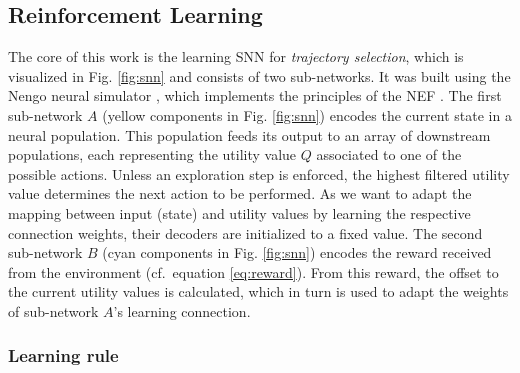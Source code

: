 \subsection{Reinforcement Learning}%
\label{subsec:reinforcement_learning_network}

The core of this work is the learning \acl{SNN} for \emph{trajectory selection}, which  is visualized in Fig. \ref{fig:snn} and consists of two sub-networks.
It was built using the Nengo neural simulator \cite{Bekolay2013}, which implements the principles of the \ac{NEF} \cite{Eliasmith2003}.
The first sub-network $A$ (yellow components in Fig. \ref{fig:snn}) encodes the current state in a neural population.
This population feeds its output to an array of downstream populations, each representing the utility value $Q$ associated to one of the possible actions.
Unless an exploration step is enforced, the highest filtered utility value determines the next action to be performed.
As we want to adapt the mapping between input (state) and utility values by learning the respective connection weights, their decoders are initialized to a fixed value. 
The second sub-network $B$ (cyan components in Fig. \ref{fig:snn}) encodes the reward received from the environment (cf.\ equation \eqref{eq:reward}).
From this reward, the offset to the current utility values is calculated, which in turn is used to adapt the weights of sub-network $A$'s learning connection.

\subsubsection{Learning rule}%
\label{ssubsec:learning_rule}


